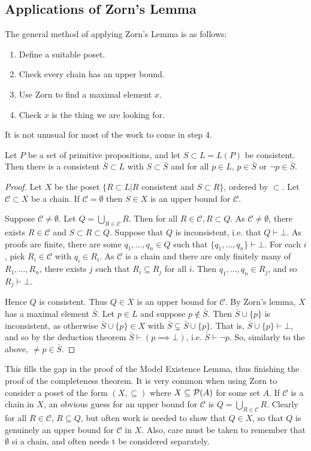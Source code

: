 \documentclass[10pt,a4paper]{article}
\begin{document}
\subsection{Applications of Zorn's Lemma}
The general method of applying Zorn's Lemma is as follows:
\begin{enumerate}
\item Define a suitable poset.
\item Check every chain has an upper bound.
\item Use Zorn to find a maximal element $x$.
\item Check $x$ is the thing we are looking for.
\end{enumerate}
It is not unusual for most of the work to come in step 4.
\begin{corollary}
Let $P$ be a set of primitive propositions, and let $S \subset L = L(P)$ be consistent. Then there is a consistent $\bar{S} \subset L$ with $S \subset \bar{S}$ and for all $p \in L$, $p \in \bar{S}$ or $\neg p \in \bar{S}$.
\end{corollary}
\begin{proof}
Let $X$ be the poset  $\{R\subset L | R$ consistent and $S \subset R\}$, ordered by $\subset$. Let $\mathscr{C} \subset X$ be a chain. If $\mathscr{C} = \emptyset$ then $S \in X$ is an upper bound for $\mathscr{C}$. 

Suppose $\mathscr{C} \neq \emptyset$. Let $Q = \bigcup_{R \in \mathscr{C}} R$. Then for all $R \in \mathscr{C}, R \subset Q$. As $\mathscr{C} \neq \emptyset$, there exists $R \in \mathscr{C}$ and $S \subset R \subset Q$. Suppose that $Q$ is inconsistent, i.e. that $Q \vdash \bot$. As proofs are finite, there are some $q_1, \ldots, q_n \in Q$ such that $\{q_1, \ldots, q_n\}\vdash\bot$. For each $i$, pick $R_i \in \mathscr{C}$ with $q_i \in R_i$. As $\mathscr{C}$ is a chain and there are only finitely many of $R_1, \ldots, R_n$, there exists $j$ such that $R_i \subseteq R_j$ for all $i$. Then $q_1, \ldots, q_n \in R_j$, and so $R_j \vdash \bot$. \contr

Hence $Q$ is consistent. Thus $Q \in X$ is an upper bound for $\mathscr{C}$. By Zorn's lemma, $X$ has a maximal element $\bar{S}$. Let $p \in L$ and suppose $p \notin \bar{S}$. Then $\bar{S} \cup \{p\}$ is inconsistent, as otherwise $\bar{S} \cup \{p\} \in X$ with $\bar{S} \subsetneq \bar{S}\cup\{p\}$. That is, $\bar{S}\cup\{p\} \vdash \bot$, and so by the deduction theorem $\bar{S} \vdash (p \implies \bot)$, i.e. $\bar{S} \vdash \neg p$. So, similarly to the above, $\neq p \in \bar{S}$.
\end{proof}
This fills the gap in the proof of the Model Existence Lemma, thus finishing the proof of the completeness theorem. It is very common when using Zorn to consider a poset of the form $(X, \subseteq)$ where $X \subseteq \mathcal{P}(A)$ for some set $A$. If $\mathscr{C}$ is a chain in $X$, an obvious guess for an upper bound for $\mathscr{C}$ is $Q = \bigcup_{R \in \mathscr{C}} R$. Clearly for all $R \in \mathscr{C}$, $R \subseteq Q$, but often work is needed to show that $Q \in X$, so that $Q$ is genuinely an upper bound for $\mathscr{C}$ in $X$. Also, care must be taken to remember that $\emptyset$ si a chain, and often needs t be considered separately.
\end{document}
